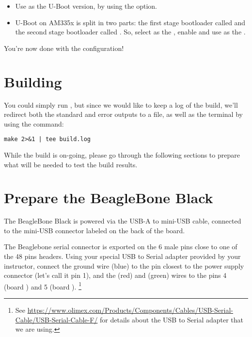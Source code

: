 \begin{itemize}
\begin{itemize}
  \item Use  as the U-Boot version, by using the
     option.

  \item U-Boot on AM335x is split in two parts: the first stage
    bootloader called  and the second stage bootloader
    called . So, select  as the
    , enable  and use  as the .

  \end{itemize}

\end{itemize}

You're now done with the configuration!

\section{Building}

You could simply run , but since we would like to keep a
log of the build, we'll redirect both the standard and error outputs
to a file, as well as the terminal by using the  command:

\begin{verbatim}
make 2>&1 | tee build.log
\end{verbatim}

While the build is on-going, please go through the following sections
to prepare what will be needed to test the build results.

\section{Prepare the BeagleBone Black}

The BeagleBone Black is powered via the USB-A to mini-USB cable,
connected to the mini-USB connector labeled  on the back of
the board.

The Beaglebone serial connector is exported on the 6 male pins close
to one of the 48 pins headers. Using your special USB to Serial
adapter provided by your instructor, connect the ground wire (blue) to
the pin closest to the power supply connector (let's call it pin 1),
and the  (red) and  (green) wires to the pins 4
(board ) and 5 (board ). \footnote{See
  \url{https://www.olimex.com/Products/Components/Cables/USB-Serial-Cable/USB-Serial-Cable-F/}
  for details about the USB to Serial adapter that we are using.}

